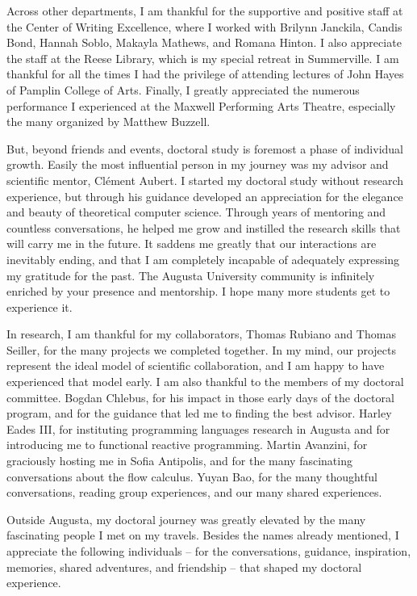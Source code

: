 Across other departments, I am thankful for the supportive and positive staff at the Center of Writing Excellence,
where I worked with Brilynn Janckila, Candis Bond, Hannah Soblo, Makayla Mathews, and Romana Hinton.
I also appreciate the staff at the Reese Library, which is my special retreat in Summerville.
I am thankful for all the times I had the privilege of attending lectures of John Hayes of Pamplin College of Arts.
Finally, I greatly appreciated the numerous performance I experienced at the Maxwell Performing Arts Theatre, especially the many organized by Matthew Buzzell.

But, beyond friends and events, doctoral study is foremost a phase of individual growth.
Easily the most influential person in my journey was my advisor and scientific mentor, Clément Aubert.
I started my doctoral study without research experience, but through his guidance developed an appreciation for the elegance and beauty of theoretical computer science.
Through years of mentoring and countless conversations, he helped me grow and instilled the research skills that will carry me in the future.
It saddens me greatly that our interactions are inevitably ending, and that I am completely incapable of adequately expressing my gratitude for the past.
The Augusta University community is infinitely enriched by your presence and mentorship.
I hope many more students get to experience it.

In research, I am thankful for my collaborators, Thomas Rubiano and Thomas Seiller, for the many projects we completed together.
In my mind, our projects represent the ideal model of scientific collaboration, and I am happy to have experienced that model early.
I am also thankful to the members of my doctoral committee.
Bogdan Chlebus, for his impact in those early days of the doctoral program, and for the guidance that led me to finding the best advisor.
Harley Eades III, for instituting programming languages research in Augusta and for introducing me to functional reactive programming.
Martin Avanzini, for graciously hosting me in Sofia Antipolis, and for the many fascinating conversations about the flow calculus.
Yuyan Bao, for the many thoughtful conversations, reading group experiences, and our many shared experiences.

Outside Augusta, my doctoral journey was greatly elevated by the many fascinating people I met on my travels.
Besides the names already mentioned, I appreciate the following individuals %
-- for the conversations, guidance, inspiration, memories, shared adventures, and friendship --
that shaped my doctoral experience.

